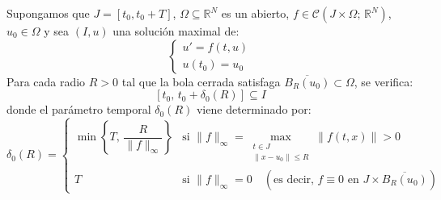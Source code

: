 \begin{teorema}
    Supongamos que $J = [t_0, t_0 + T]$, $\Omega \subseteq \mathbb{R}^N$ es un abierto, $f \in \mathcal{C}(J \times \Omega; \, \mathbb{R}^N)$, $u_0 \in \Omega$ y sea $(I, u)$ una solución maximal de:
    \[
        \begin{cases}
            u' = f(t, u) \\
            u(t_0) = u_0
        \end{cases}
    \]
    Para cada radio $R > 0$ tal que la bola cerrada satisfaga $\overline{B_R(u_0)} \subset \Omega$, se verifica:
    \[
        [t_0, \, t_0 + \delta_0(R)] \subseteq I
    \]
    donde el parámetro temporal $\delta_0(R)$ viene determinado por:
    \[
        \delta_0(R) = \begin{cases}
            \min\left\{ T, \, \dfrac{R}{\|f\|_\infty} \right\} & \text{si } \|f\|_\infty = \displaystyle\max_{\substack{t \in J \\ \|x - u_0\| \leq R}} \|f(t, x)\| > 0 \\
            T & \text{si } \|f\|_\infty = 0 \quad (\text{es decir, } f \equiv 0 \text{ en } J \times \overline{B_R(u_0)})
        \end{cases}
    \]
\end{teorema}

